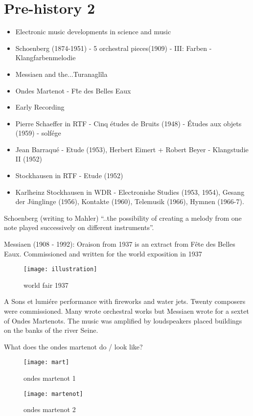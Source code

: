 \section{Pre-history 2}
\begin{itemize}
\item Electronic music developments in science and music
\item Schoenberg (1874-1951) - 5 orchestral pieces(1909) - III: Farben - Klangfarbenmelodie
\item Messiaen and the...Turanaglîla
\item Ondes Martenot - F\^te des Belles Eaux
\item Early Recording
\item Pierre Schaeffer in RTF - Cinq \'etudes de Bruits (1948) - \'Etudes aux objets (1959) - solfége
\item Jean Barraqu\'e - Etude (1953), Herbert Eimert + Robert Beyer - Klangstudie II (1952)
\item Stockhausen in RTF - Etude (1952)
\item Karlheinz Stockhausen in WDR - Electronishe Studies (1953, 1954), Gesang der J\"unglinge (1956), Kontakte (1960), Telemusik (1966), Hymnen (1966-7).
\end{itemize}

Schoenberg (writing to Mahler) ``..the possibility of creating a melody from one note played successively on different instruments''.

Messiaen (1908 - 1992): Oraison from 1937 is an extract from F\^ete des Belles Eaux. Commissioned and written for the world exposition in 1937

\begin{figure}[H]
\centering
\texttt{[image: illustration]}\caption{world fair 1937}
\label{fig:worldfair}
\end{figure}

A Sons et lumi\'ere performance with fireworks and water jets. Twenty composers were commissioned. Many wrote orchestral works but Messiaen wrote for a sextet of Ondes Martenots. The music was amplified by loudspeakers placed buildings on the banks of the river Seine.

What does the ondes martenot do / look like?

\begin{figure}[H]
\centering
\texttt{[image: mart]}\caption{ondes martenot 1}
\label{fig:worldfair}
\end{figure}

\begin{figure}[H]
\centering
\texttt{[image: martenot]}\caption{ondes martenot 2}
\label{fig:worldfair}
\end{figure}

